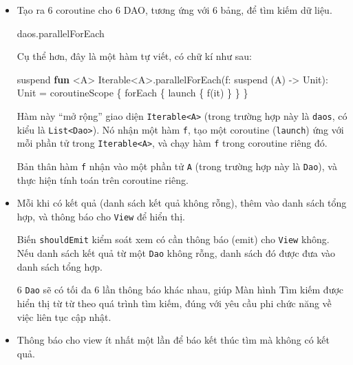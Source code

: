 \documentclass[
]{article}
\newenvironment{Shaded}{}{}
\newcommand{\DataTypeTok}[1]{\textcolor[rgb]{0.56,0.13,0.00}{#1}}
\newcommand{\FunctionTok}[1]{\textcolor[rgb]{0.02,0.16,0.49}{#1}}
\newcommand{\KeywordTok}[1]{\textcolor[rgb]{0.00,0.44,0.13}{\textbf{#1}}}
\newcommand{\NormalTok}[1]{#1}
\newcommand{\OperatorTok}[1]{\textcolor[rgb]{0.40,0.40,0.40}{#1}}
\newcommand{\VariableTok}[1]{\textcolor[rgb]{0.10,0.09,0.49}{#1}}
\begin{document}
\begin{itemize}
\item
  Tạo ra 6 coroutine cho 6 DAO, tương ứng với 6 bảng, để tìm kiếm dữ
  liệu.

\begin{Shaded}
\begin{Highlighting}[]
\NormalTok{daos}\OperatorTok{.}\NormalTok{parallelForEach}
\end{Highlighting}
\end{Shaded}

  Cụ thể hơn, đây là một hàm tự viết, có chữ kí như sau:

\begin{Shaded}
\begin{Highlighting}[]
\NormalTok{suspend }\KeywordTok{fun} \OperatorTok{<}\DataTypeTok{A}\OperatorTok{>} \FunctionTok{Iterable}\OperatorTok{<}\DataTypeTok{A}\OperatorTok{>.}\FunctionTok{parallelForEach}\OperatorTok{(}\VariableTok{f}\OperatorTok{:} \DataTypeTok{suspend}\NormalTok{ (}\VariableTok{A}\OperatorTok{)}\NormalTok{ {-}> }\FunctionTok{Unit}\NormalTok{)}\OperatorTok{:} \DataTypeTok{Unit} \OperatorTok{=}
\NormalTok{    coroutineScope }\OperatorTok{\{}\NormalTok{ forEach }\OperatorTok{\{}\NormalTok{ launch }\OperatorTok{\{}\NormalTok{ f}\OperatorTok{(}\NormalTok{it}\OperatorTok{)} \OperatorTok{\}} \OperatorTok{\}} \OperatorTok{\}}
\end{Highlighting}
\end{Shaded}

  Hàm này ``mở rộng'' giao diện
  \texttt{Iterable<A>} (trong trường hợp này là
  \texttt{daos}, có kiểu là \texttt{List<Dao>}).
  Nó nhận một hàm \texttt{f}, tạo một coroutine (\texttt{launch}) ứng
  với mỗi phần tử trong \texttt{Iterable<A>}, và
  chạy hàm \texttt{f} trong coroutine riêng đó.

  Bản thân hàm \texttt{f} nhận vào một phần tử \texttt{A} (trong trường
  hợp này là \texttt{Dao}), và thực hiện tính toán trên coroutine riêng.
\item
  Mỗi khi có kết quả (danh sách kết quả không rỗng), thêm vào danh sách
  tổng hợp, và thông báo cho \texttt{View} để hiển thị.

  Biến \texttt{shouldEmit} kiểm soát xem có cần thông báo (emit) cho
  \texttt{View} không. Nếu danh sách kết quả từ một \texttt{Dao} không
  rỗng, danh sách đó được đưa vào danh sách tổng hợp.

  6 \texttt{Dao} sẽ có tối đa 6 lần thông báo khác nhau, giúp Màn hình
  Tìm kiếm được hiển thị từ từ theo quá trình tìm kiếm, đúng với yêu cầu
  phi chức năng về việc liên tục cập nhật.
\item
  Thông báo cho view ít nhất một lần để báo kết thúc tìm mà không có kết
  quả.


\end{itemize}
\end{document}
